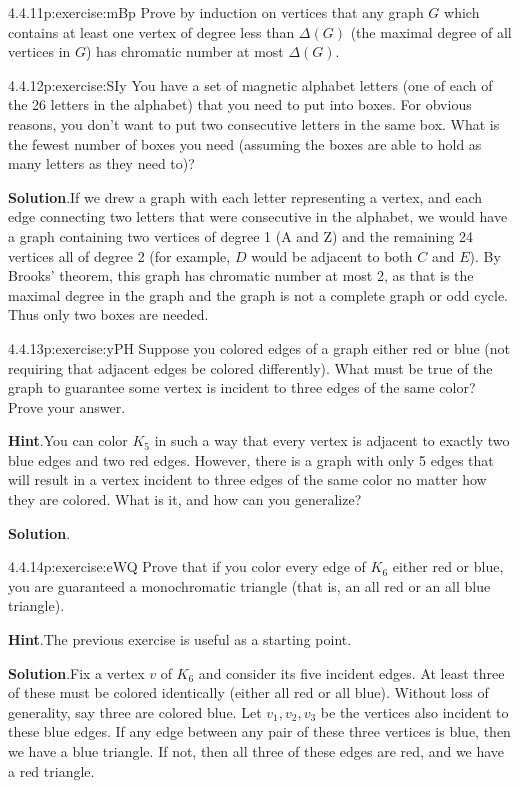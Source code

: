 \documentclass[twoside,11pt,]{book}
\newcommand{\blocktitlefont}{\relax}
\numberwithin{equation}{chapter}
\begin{document}
\begin{divisionsolution}{4.4.11}{}{p:exercise:mBp}%
Prove by induction on vertices that any graph \(G\) which contains at least one vertex of degree less than \(\Delta(G)\) (the maximal degree of all vertices in \(G\)) has chromatic number at most \(\Delta(G)\).%
\end{divisionsolution}%
\begin{divisionsolution}{4.4.12}{}{p:exercise:SIy}%
You have a set of magnetic alphabet letters (one of each of the 26 letters in the alphabet) that you need to put into boxes. For obvious reasons, you don't want to put two consecutive letters in the same box. What is the fewest number of boxes you need (assuming the boxes are able to hold as many letters as they need to)?%
\par\smallskip%
\noindent\textbf{\blocktitlefont Solution}.\quad{}If we drew a graph with each letter representing a vertex, and each edge connecting two letters that were consecutive in the alphabet, we would have a graph containing two vertices of degree 1 (A and Z) and the remaining 24 vertices all of degree 2 (for example, \(D\) would be adjacent to both \(C\) and \(E\)). By Brooks' theorem, this graph has chromatic number at most 2, as that is the maximal degree in the graph and the graph is not a complete graph or odd cycle. Thus only two boxes are needed.%
\end{divisionsolution}%
\begin{divisionsolution}{4.4.13}{}{p:exercise:yPH}%
Suppose you colored edges of a graph either red or blue (not requiring that adjacent edges be colored differently).  What must be true of the graph to guarantee some vertex is incident to three edges of the same color?  Prove your answer.%
\par\smallskip%
\noindent\textbf{\blocktitlefont Hint}.\quad{}You can color \(K_5\) in such a way that every vertex is adjacent to exactly two blue edges and two red edges.  However, there is a graph with only 5 edges that will result in a vertex incident to three edges of the same color no matter how they are colored.  What is it, and how can you generalize?%
\par\smallskip%
\noindent\textbf{\blocktitlefont Solution}.\quad{}%
\end{divisionsolution}%
\begin{divisionsolution}{4.4.14}{}{p:exercise:eWQ}%
Prove that if you color every edge of \(K_6\) either red or blue, you are guaranteed a monochromatic triangle (that is, an all red or an all blue triangle).%
\par\smallskip%
\noindent\textbf{\blocktitlefont Hint}.\quad{}The previous exercise is useful as a starting point.%
\par\smallskip%
\noindent\textbf{\blocktitlefont Solution}.\quad{}Fix a vertex \(v\) of \(K_6\) and consider its five incident edges.  At least three of these must be colored identically (either all red or all blue).  Without loss of generality, say three are colored blue.  Let \(v_1, v_2, v_3\) be the vertices also incident to these blue edges.  If any edge between any pair of these three vertices is blue, then we have a blue triangle.  If not, then all three of these edges are red, and we have a red triangle.%
\end{divisionsolution}%
\end{document}
